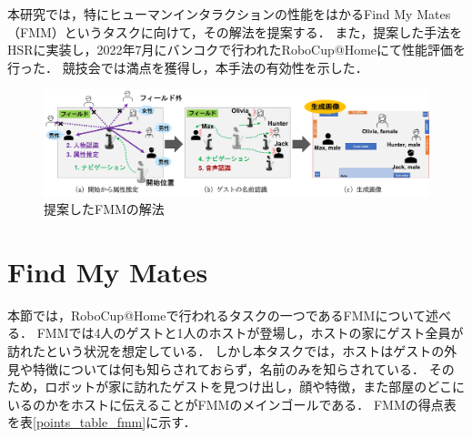\documentclass[a4j]{jarticle}
\begin{document}
本研究では，特にヒューマンインタラクションの性能をはかるFind My Mates（FMM）というタスクに向けて，その解法を提案する．
また，提案した手法をHSRに実装し，2022年7月にバンコクで行われたRoboCup@Homeにて性能評価を行った．
競技会では満点を獲得し，本手法の有効性を示した．

\begin{figure}[ht]
  \centering
  \includegraphics[width=16cm]{images/FMM/solution_overview_yoko_yy2_cap.png}
  \caption{提案したFMMの解法}
  \label{solution_overview}
\end{figure}



\section{Find My Mates}
本節では，RoboCup@Homeで行われるタスクの一つであるFMMについて述べる．
FMMでは4人のゲストと1人のホストが登場し，ホストの家にゲスト全員が訪れたという状況を想定している．
しかし本タスクでは，ホストはゲストの外見や特徴については何も知らされておらず，名前のみを知らされている．
そのため，ロボットが家に訪れたゲストを見つけ出し，顔や特徴，また部屋のどこにいるのかをホストに伝えることがFMMのメインゴールである．
FMMの得点表を表\ref{points_table_fmm}に示す．
\end{document}
